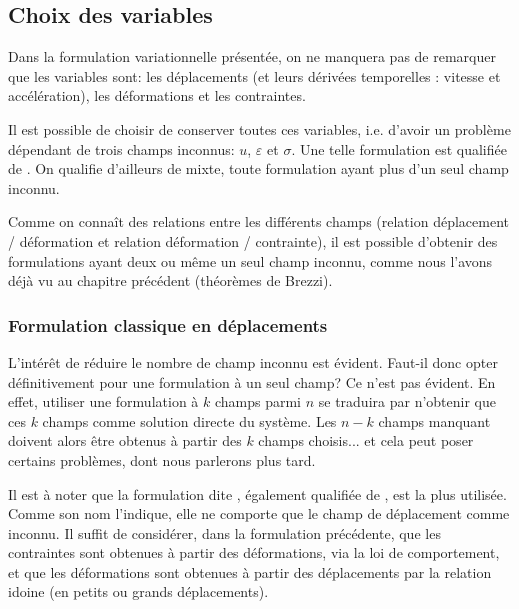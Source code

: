\medskip
\subsection{Choix des variables}\label{Sec-form}

Dans la formulation variationnelle présentée, on ne manquera pas de remarquer
que les variables sont: les déplacements (et leurs dérivées temporelles : vitesse et accélération),
les déformations et les contraintes.

Il est possible de choisir de conserver toutes ces variables, i.e. d'avoir un problème
dépendant de trois champs inconnus: $u$, $\varepsilon$ et $\sigma$.
Une telle formulation est qualifiée de .
On qualifie d'ailleurs de mixte, toute formulation ayant plus d'un seul champ inconnu.

Comme on connaît des relations entre les différents champs (relation déplacement /
déformation et relation déformation / contrainte), il est possible
d'obtenir des formulations ayant deux ou même un seul champ inconnu, comme
nous l'avons déjà vu au chapitre précédent (théorèmes de Brezzi).

\medskip
\subsubsection{Formulation classique en déplacements}
L'intérêt de réduire le nombre de champ inconnu est évident.
Faut-il donc opter définitivement pour une formulation à un seul champ?
Ce n'est pas évident. En effet, utiliser une formulation à $k$ champs parmi $n$
se traduira par n'obtenir que ces $k$ champs comme solution directe du
système. Les $n-k$ champs  manquant doivent alors être obtenus à partir des
$k$ champs choisis... et cela peut poser certains problèmes, dont nous parlerons plus tard.

Il est à noter que la formulation dite , également
qualifiée de , est la plus utilisée. Comme son nom
l'indique, elle ne comporte que le champ de déplacement comme inconnu.
Il suffit de considérer, dans la formulation précédente, que les contraintes
sont obtenues à partir des déformations, via la loi de comportement, et que
les déformations sont obtenues à partir des déplacements par la relation
idoine (en petits ou grands déplacements).

